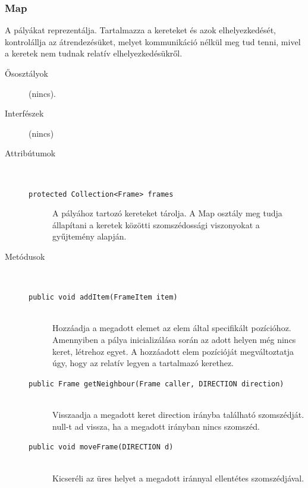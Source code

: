		\subsubsection{Map}
				 A pályákat reprezentálja. Tartalmazza a kereteket és azok elhelyezkedését,  kontrolállja az átrendezésüket, melyet kommunikáció nélkül meg tud tenni, mivel a keretek nem tudnak relatív elhelyezkedésükről. 			\begin{description}


				\item[Ősosztályok] (nincs).
				\item[Interfészek] (nincs)
				\item[Attribútumok]$\ $
					\begin{description}
						\item[\texttt{protected Collection<Frame> frames}] A pályához tartozó kereteket tárolja. A Map osztály  meg tudja állapítani a keretek közötti szomszédossági  viszonyokat a gyűjtemény alapján. 
					\end{description}
				\item[Metódusok]$\ $
					\begin{description}
						\item[\texttt{public void addItem(FrameItem item)}] \hfill \\ Hozzáadja a megadott elemet az elem által specifikált pozícióhoz.  Amennyiben a pálya inicializálása során az adott helyen még nincs keret,  létrehoz egyet.   A hozzáadott elem pozícióját megváltoztatja úgy, hogy az relatív  legyen a tartalmazó kerethez. 
						\item[\texttt{public Frame getNeighbour(Frame caller, DIRECTION direction)}] \hfill \\ Visszaadja a megadott keret direction irányba található  szomszédját. null-t ad vissza, ha a megadott irányban  nincs szomszéd. 
						\item[\texttt{public void moveFrame(DIRECTION d)}] \hfill \\ Kicseréli az üres helyet a megadott iránnyal ellentétes  szomszédjával. 
					\end{description}
			\end{description}

